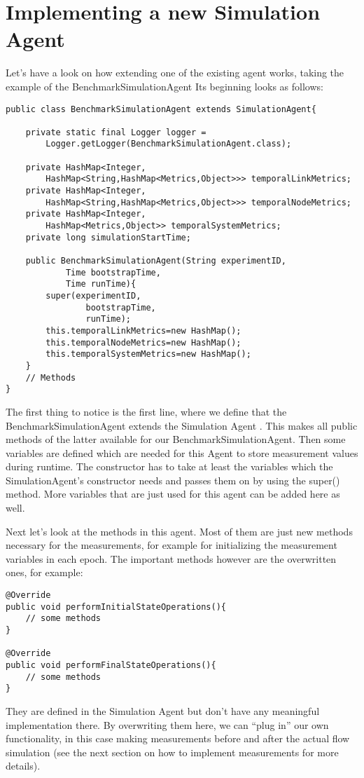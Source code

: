 \documentclass[11pt,fleqn]{book} %
\newcommand{\MainAgent}{Simulation Agent }
\newcommand{\BenchmarkAgent}{BenchmarkSimulationAgent}
\begin{document}
\section{Implementing a new \MainAgent}
Let’s have a look on how extending one of the existing agent works, taking the example of the \BenchmarkAgent{} Its beginning looks as follows:
\begin{lstlisting}[frame=single]
public class BenchmarkSimulationAgent extends SimulationAgent{
    
    private static final Logger logger = 
    	Logger.getLogger(BenchmarkSimulationAgent.class);
    
    private HashMap<Integer,
    	HashMap<String,HashMap<Metrics,Object>>> temporalLinkMetrics;
    private HashMap<Integer,
    	HashMap<String,HashMap<Metrics,Object>>> temporalNodeMetrics;
    private HashMap<Integer,
    	HashMap<Metrics,Object>> temporalSystemMetrics;
    private long simulationStartTime;
    
    public BenchmarkSimulationAgent(String experimentID, 
            Time bootstrapTime, 
            Time runTime){
        super(experimentID,
                bootstrapTime,
                runTime);
        this.temporalLinkMetrics=new HashMap();
        this.temporalNodeMetrics=new HashMap();
        this.temporalSystemMetrics=new HashMap();
    }
    // Methods
}
\end{lstlisting}
The first thing to notice is the first line, where we define that the \BenchmarkAgent{} extends the \MainAgent{}. This makes all public methods of the latter available for our \BenchmarkAgent{}. Then some variables are defined which are needed for this Agent to store measurement values during runtime. The constructor has to take at least the variables which the SimulationAgent’s constructor needs and passes them on by using the super() method. More variables that are just used for this agent can be added here as well.

Next let’s look at the methods in this agent. Most of them are just new methods necessary for the measurements, for example for initializing the measurement variables in each epoch. The important methods however are the overwritten ones, for example:
\begin{lstlisting}[frame=single]
@Override
public void performInitialStateOperations(){
	// some methods
}
    
@Override
public void performFinalStateOperations(){
	// some methods
}
\end{lstlisting}
They are defined in the \MainAgent{} but don’t have any meaningful implementation there. By overwriting them here, we can “plug in” our own functionality, in this case making measurements before and after the actual flow simulation (see the next section on how to implement measurements for more details).
\end{document}

